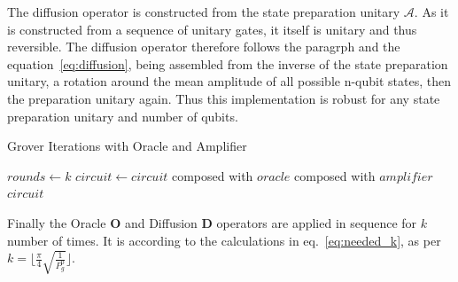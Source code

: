 \documentclass[encoding=utf8,british]{tumphthesis}
\begin{document}
    The diffusion operator is constructed from the state preparation unitary $\mathcal{A}$. As it is constructed from a sequence of unitary gates, it itself is
    unitary and thus reversible. The diffusion operator therefore follows the paragrph and the equation~\ref{eq:diffusion}, being assembled from the inverse of 
    the state preparation unitary, a rotation around the mean amplitude of all possible n-qubit states, then the preparation unitary again. Thus this implementation 
    is robust for any state preparation unitary and number of qubits.

    \begin{algorithm}[H]
    \caption{Grover Iterations with Oracle and Amplifier}
    \label{alg:applysunscreen}
    \begin{algorithmic}[5]
        \State$rounds \gets k$
            \State $circuit \gets circuit$ composed with $oracle$ composed with $amplifier$
        \EndFor
        \State \Return $circuit$
    \EndFunction
    \end{algorithmic}
    \end{algorithm}

    Finally the Oracle \textbf{O} and Diffusion \textbf{D} operators are applied in sequence for $k$ number of times. 
    It is according to the calculations in eq.~\ref{eq:needed_k}, as per $k = \lfloor \frac{\pi}{4} \sqrt{\frac{1}{P_g^0}} \rfloor$.



\backmatter
\printbibliography
\end{document}
